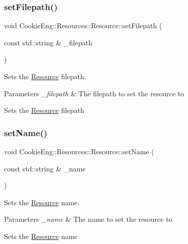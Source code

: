 \subsubsection{\texorpdfstring{set\+Filepath()}{setFilepath()}}
{\footnotesize\ttfamily void Cookie\+Eng\+::\+Resources\+::\+Resource\+::set\+Filepath (\begin{DoxyParamCaption}\item[{const std\+::string \&}]{\+\_\+filepath }\end{DoxyParamCaption})\hspace{0.3cm}{\ttfamily [inline]}}



Sets the \hyperlink{class_cookie_eng_1_1_resources_1_1_resource}{Resource} filepath. 


\begin{DoxyParams}{Parameters}
{\em \+\_\+filepath} & The filepath to set the resource to\\
\hline
\end{DoxyParams}
Sets the \hyperlink{class_cookie_eng_1_1_resources_1_1_resource}{Resource} filepath \mbox{\label{class_cookie_eng_1_1_resources_1_1_resource_a3968130b5e2207df4735a616c6545158}} 
\subsubsection{\texorpdfstring{set\+Name()}{setName()}}
{\footnotesize\ttfamily void Cookie\+Eng\+::\+Resources\+::\+Resource\+::set\+Name (\begin{DoxyParamCaption}\item[{const std\+::string \&}]{\+\_\+name }\end{DoxyParamCaption})\hspace{0.3cm}{\ttfamily [inline]}}



Sets the \hyperlink{class_cookie_eng_1_1_resources_1_1_resource}{Resource} name. 


\begin{DoxyParams}{Parameters}
{\em \+\_\+name} & The name to set the resource to\\
\hline
\end{DoxyParams}
Sets the \hyperlink{class_cookie_eng_1_1_resources_1_1_resource}{Resource} name \mbox{\label{class_cookie_eng_1_1_resources_1_1_resource_ae7f9a2883f18b3a9d2e4e470c83bb704}} 

